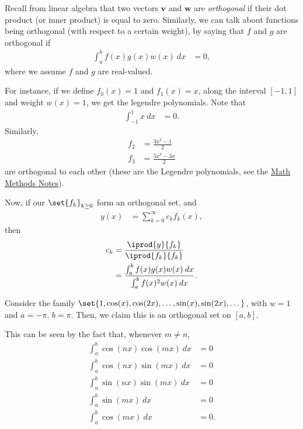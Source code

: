 \documentclass[10pt]{mypackage}
\begin{document}
  \begin{example}[]
  Recall from linear algebra that two vectors $\mathbf{v}$ and $\mathbf{w}$ are \textit{orthogonal} if their dot product (or inner product) is equal to zero. Similarly, we can talk about functions being orthogonal (with respect to a certain weight), by saying that $f$ and $g$ are orthogonal if
  \begin{align*}
    \int_{a}^{b} f(x)g(x)w(x)\:dx &= 0,
  \end{align*}
  where we assume $f$ and $g$ are real-valued.\newline

  For instance, if we define $f_0(x) = 1$ and $f_1(x) = x$, along the interval $[-1,1]$ and weight $w(x) = 1$, we get the legendre polynomials. Note that
  \begin{align*}
    \int_{-1}^{1} x\:dx &= 0.
  \end{align*}
  Similarly,
  \begin{align*}
    f_2 &= \frac{3x^2 - 1}{2}\\
    f_3 &= \frac{5x^3 - 3x}{2}
  \end{align*}
  are orthogonal to each other (these are the Legendre polynomials, see the \href{https://ai.avinash-iyer.com/Classes_and_Homework/College/Y4/Y4S1,\%20Math\%20Methods/math_methods_notes.pdf}{Math Methods Notes}).\newline

  Now, if our $\set{f_k}_{k\geq 0}$ form an orthogonal set, and
  \begin{align*}
    y(x) &= \sum_{k=0}^{\infty}c_kf_k(x),
  \end{align*}
  then
  \begin{align*}
    c_k &= \frac{ \iprod{y}{f_k} }{ \iprod{f_k}{f_k} }\\
        &= \frac{ \int_{a}^{b} f(x)g(x)w(x)\:dx }{ \int_{a}^{b} f(x)^2w(x)\:dx }.
  \end{align*}
\end{example}
\begin{example}
  Consider the family $\set{1,\cos(x),\cos(2x),\dots,\sin(x),\sin(2x),\dots}$, with $w = 1$ and $a=-\pi$, $b = \pi$. Then, we claim this is an orthogonal set on $[a,b]$.\newline

  This can be seen by the fact that, whenever $m\neq n$,
  \begin{align*}
    \int_{a}^{b} \cos\left( nx \right)\cos\left( mx \right)\:dx &= 0\\
    \int_{a}^{b} \cos\left( nx \right)\sin\left( mx \right)\:dx &= 0\\
    \int_{a}^{b} \sin\left( nx \right)\sin\left( mx \right)\:dx &= 0\\
    \int_{a}^{b} \sin\left( mx \right)\:dx &= 0\\
    \int_{a}^{b} \cos\left( mx \right)\:dx &= 0.
  \end{align*}
\end{example}
\end{document}
